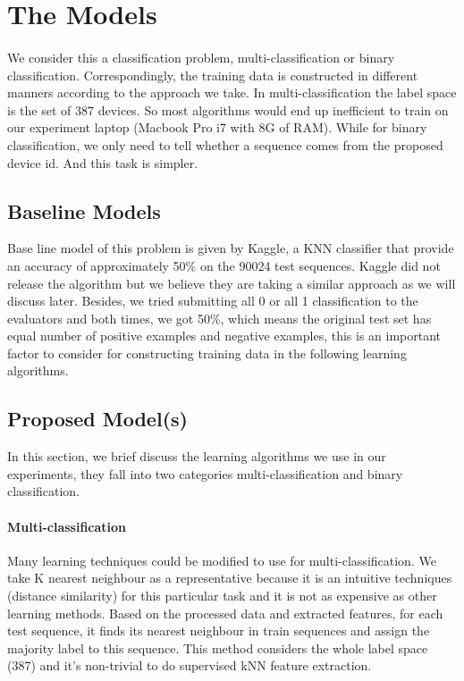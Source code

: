 \documentclass[11pt,letterpaper]{article}
\begin{document}
\section{The Models}
\label{sec:models}
\paragraph{} We consider this a classification problem, multi-classification or binary classification. Correspondingly, the training data is constructed in different manners according to the approach we take. In multi-classification the label space is the set of 387 devices. So most algorithms would end up inefficient to train on our experiment laptop (Macbook Pro i7 with 8G of RAM). While for binary classification, we only need to tell whether a sequence comes from the proposed device id. And this task is simpler.

\subsection{Baseline Models}
\label{sec:baseline-models}
Base line model of this problem is given by Kaggle, a KNN classifier that provide an accuracy of approximately 50\% on the 90024 test sequences. Kaggle did not release the algorithm but we believe they are taking a similar approach as we will discuss later. Besides, we tried submitting all 0 or all 1 classification to the evaluators and both times, we got 50\%, which means the original test set has equal number of positive examples and negative examples, this is an important factor to consider for constructing training data in the following learning algorithms.




\subsection{Proposed Model(s)}
\label{sec:proposed-models}
In this section, we brief discuss the learning algorithms we use in our experiments, they fall into two categories multi-classification and binary classification.
\paragraph {Multi-classification}
Many learning techniques could be modified to use for multi-classification. We take K nearest neighbour as a representative because it is an intuitive techniques (distance similarity) for this particular task and it is not as expensive as other learning methods.
Based on the processed data and extracted features, for each test sequence, it finds its nearest neighbour in train sequences and assign the majority label to this sequence. This method considers the whole label space (387) and it's non-trivial to do supervised kNN feature extraction.
\end{document}
